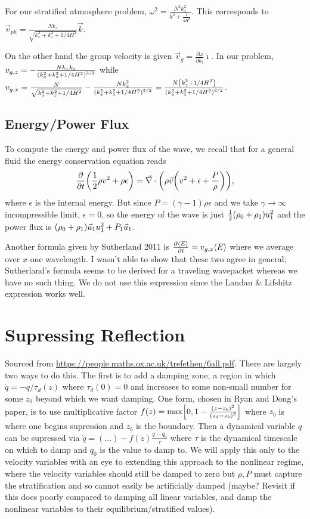\documentclass[11pt,
        usenames, %
        dvipsnames %
    ]{report}
\newcommand*{\pd}[2]{\frac{\partial#1}{\partial#2}}
\DeclarePairedDelimiter\ev{\langle}{\rangle}
\DeclarePairedDelimiter\p{\lparen}{\rparen}
\DeclarePairedDelimiter\s{\lbrack}{\rbrack}
\begin{document}
For our stratified atmosphere problem, $\omega^2 = \frac{N^2 k_x^2}{k^2 +
\frac{1}{4H^2}}$. This corresponds to $\vec{v}_{ph} = \frac{Nk_x}{\sqrt{k_x^2 +
k_z^2 + 1/4H^2}} \vec{k}$.

On the other hand the group velocity is given $\vec{v}_g =
\pd{\omega}{k_i}\hat{\imath}$. In our problem, $v_{g, z} =
-\frac{Nk_xk_z}{\p*{k_x^2 + k_z^2 + 1/4H^2}^{3/2}}$ while $v_{g, x} =
\frac{N}{\sqrt{k_x^2 + k_z^2 + 1/4H^2}} - \frac{Nk_x^2}{\p*{k_x^2 +
k_z^2 + 1/4H^2}^{3/2}} = \frac{N\p*{k_z^2 + 1/4H^2}}{\p*{k_x^2 +
k_z^2 + 1/4H^2}^{3/2}}$.

\subsection{Energy/Power Flux}

To compute the energy and power flux of the wave, we recall that for a general
fluid the energy conservation equation reads
\begin{equation}
    \pd{}{t}\p*{\frac{1}{2}\rho v^2 + \rho \epsilon}
        = \vec{\nabla} \cdot \p*{
            \rho \vec{v}\p*{v^2 + \epsilon + \frac{P}{\rho}}
        },
\end{equation}
where $\epsilon$ is the internal energy. But since $P = (\gamma -
1)\rho\epsilon$ and we take $\gamma \to \infty$ incompressible limit, $\epsilon
= 0$, so the energy of the wave is just $\frac{1}{2}\p*{\rho_0 + \rho_1} u_1^2$
and the power flux is $\p*{\rho_0 + \rho_1}\vec{u}_1u_1^2 + P_1\vec{u}_1$.

Another formula given by Sutherland 2011 is $\pd{\ev*{E}}{t} = v_{g, z}
\ev*{E}$ where we average over $x$ one wavelength. I wasn't able to show
that these two agree in general; Sutherland's formula seems to be derived for a
traveling wavepacket whereas we have no such thing. We do not use this
expression since the Landau \& Lifshitz expression works well.

\section{Supressing Reflection}

Sourced from \url{https://people.maths.ox.ac.uk/trefethen/6all.pdf}. There are
largely two ways to do this. The first is to add a damping zone, a region in
which $\dot{q} = -q/\tau_d(z)$ where $\tau_d(0) = 0$ and increases to some
non-small number for some $z_0$ beyond which we want damping. One form, chosen
in Ryan and Dong's paper, is to use multiplicative factor $f(z) = \max\s*{0, 1 -
\frac{\p*{z - z_b}^2}{\p*{z_d - z_b}^2}}$ where $z_b$ is where one begins
supression and $z_b$ is the boundary. Then a dynamical variable $q$ can be
supressed via $\dot{q} = (\dots) - f(z)\frac{q - q_0}{\tau}$ where $\tau$ is the
dynamical timescale on which to damp and $q_0$ is the value to damp to. We will
apply this only to the velocity variables with an eye to extending this approach
to the nonlinear regime, where the velocity variables should still be damped to
zero but $\rho, P$ must capture the stratification and so cannot easily be
artificially damped (maybe? Revisit if this does poorly compared to damping all
linear variables, and damp the nonlinear variables to their
equilibrium/stratified values).
\end{document}
